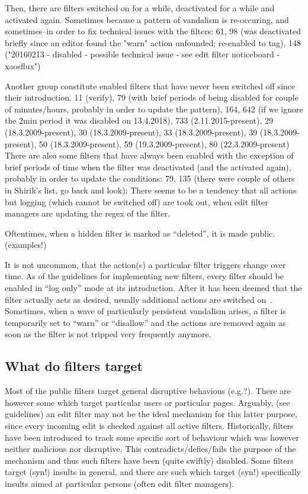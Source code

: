 Then, there are filters switched on for a while, deactivated for a while and activated again.
Sometimes because a pattern of vandalism is re-occuring, and sometimes–in order to fix technical issues with the filters: 61, 98 (was deactivated briefly since an editor found the "warn" action unfounded; re-enabled to tag), 148 ("20160213 - disabled - possible technical issue - see edit filter noticeboard - xaosflux")

Another group constitute enabled filters that have never been switched off since their introduction.
  11 (verify), 79 (with brief periods of being disabled for couple of minutes/hours, probably in order to update the pattern), 164, 642 (if we ignore the 2min period it was disabled on 13.4.2018), 733 (2.11.2015-present), 29 (18.3.2009-present), 30 (18.3.2009-present), 33 (18.3.2009-present), 39 (18.3.2009-present), 50 (18.3.2009-present), 59 (19.3.2009-present), 80 (22.3.2009-present)
There are also some filters that have always been enabled with the exception of brief periods of time when the filter was deactivated (and the activated again), probably in order to update the conditions: 79, 135 (there were couple of others in Shirik's list, go back and look);
There seems to be a tendency that all actions but logging (which cannot be switched off) are took out, when edit filter managers are updating the regex of the filter.

Oftentimes, when a hidden filter is marked as ``deleted'', it is made public. (examples!)

It is not uncommon, that the action(s) a particular filter triggers change over time.
As of the guidelines for implementing new filters, every filter should be enabled in ``log only'' mode at its introduction.
After it has been deemed that the filter actually acts as desired, usually additional actions are switched on~\cite{Wikipedia:EditFilterInstructions}.
Sometimes, when a wave of particularly persistent vandalism arises, a filter is temporarily set to ``warn'' or ``disallow'' and the actions are removed again as soon as the filter is not tripped very frequently anymore. %

\subsection{What do filters target}%

Most of the public filters target general disruptive behavious (e.g.?).
There are however some which target particular users or particular pages.
Arguably, (see guidelines) an edit filter may not be the ideal mechanism for this latter purpose, since every incoming edit is checked against all active filters.
Historically, filters have been introduced to track some specific sort of behaviour which was however neither malicious nor disruptive.
This contradicts/defies/fails the purpose of the mechanism and thus such filters have been (quite swiftly) disabled.
Some filters target (syn!) insults in general, and there are such which target (syn!) specifically insults aimed at particular persons (often edit filter managers).

